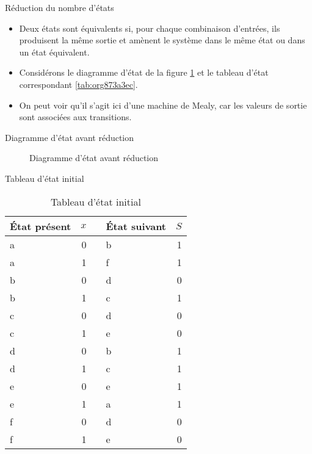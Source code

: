 \documentclass[presentation]{beamer}
\begin{document}
\begin{frame}[label={sec:orgfee7196}]{Réduction du nombre d'états}
\begin{itemize}
\item Deux états sont équivalents si, pour chaque combinaison d'entrées, ils produisent la même sortie et amènent le système dans le même état ou dans un état équivalent.

\item Considérons le diagramme d'état de la figure \ref{fig:org6373f32} et le tableau d'état correspondant \ref{tab:org873a3ec}.

\item On peut voir qu'il s'agit ici d'une machine de Mealy, car les valeurs de sortie sont associées aux transitions.
\end{itemize}
\end{frame}

\begin{frame}[label={sec:org4563cd5}]{Diagramme d'état avant réduction}
\begin{figure}[htbp]
\centering

\caption{\label{fig:org6373f32}Diagramme d'état avant réduction}
\end{figure}
\end{frame}

\begin{frame}[label={sec:org4cdce35}]{Tableau d'état initial}
\begin{table}[htbp]
\caption{\label{tab:org5732b47}Tableau d'état initial}
\centering
\begin{tabular}{lrllr}
État présent & \(x\) &  & État suivant & \(S\)\\
\hline
a & 0 &  & b & 1\\
a & 1 &  & f & 1\\
b & 0 &  & d & 0\\
b & 1 &  & c & 1\\
c & 0 &  & d & 0\\
c & 1 &  & e & 0\\
d & 0 &  & b & 1\\
d & 1 &  & c & 1\\
e & 0 &  & e & 1\\
e & 1 &  & a & 1\\
f & 0 &  & d & 0\\
f & 1 &  & e & 0\\
\end{tabular}
\end{table}
\end{frame}
\end{document}
